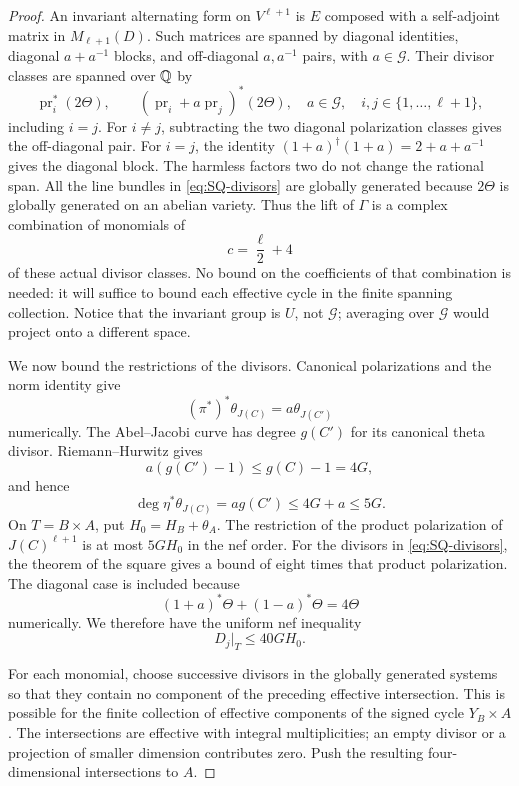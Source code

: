 \begin{proof}
An invariant alternating form on $V^{\ell+1}$ is $E$ composed with a self-adjoint matrix in $M_{\ell+1}(D)$. Such matrices are spanned by diagonal identities, diagonal $a+a^{-1}$ blocks, and off-diagonal $a,a^{-1}$ pairs, with $a\in\mathcal G$. Their divisor classes are spanned over $\mathbb Q$ by
\begin{equation}\label{eq:SQ-divisors}
 \operatorname{pr}_i^*(2\Theta),\qquad
 (\operatorname{pr}_i+a\operatorname{pr}_j)^*(2\Theta),
 \quad a\in\mathcal G,\quad i,j\in\{1,\ldots,\ell+1\},
\end{equation}
including $i=j$. For $i\ne j$, subtracting the two diagonal polarization classes gives the off-diagonal pair. For $i=j$, the identity
$(1+a)^\dagger(1+a)=2+a+a^{-1}$ gives the diagonal block. The harmless factors two do not change the rational span. All the line bundles in \eqref{eq:SQ-divisors} are globally generated because $2\Theta$ is globally generated on an abelian variety. Thus the lift of $\Gamma$ is a complex combination of monomials of
\[
 c=\frac\ell2+4
\]
of these actual divisor classes. No bound on the coefficients of that combination is needed: it will suffice to bound each effective cycle in the finite spanning collection. Notice that the invariant group is $U$, not $\mathcal G$; averaging over $\mathcal G$ would project onto a different space.

We now bound the restrictions of the divisors. Canonical polarizations and the norm identity give
\[
 (\pi^*)^*\theta_{J(C)}=a\theta_{J(C')}
\]
numerically. The Abel--Jacobi curve has degree $g(C')$ for its canonical theta divisor. Riemann--Hurwitz gives
\[
 a(g(C')-1)\le g(C)-1=4G,
\]
and hence
\begin{equation}\label{eq:SQ-curvedegree}
 \deg\eta^*\theta_{J(C)}=a g(C')\le4G+a\le5G.
\end{equation}
On $T=B\times A$, put $H_0=H_B+\theta_A$. The restriction of the product polarization of $J(C)^{\ell+1}$ is at most $5GH_0$ in the nef order. For the divisors in \eqref{eq:SQ-divisors}, the theorem of the square gives a bound of eight times that product polarization. The diagonal case is included because
\[
 (1+a)^*\Theta+(1-a)^*\Theta=4\Theta
\]
numerically. We therefore have the uniform nef inequality
\begin{equation}\label{eq:SQ-nef}
 D_j|_T\le40G H_0.
\end{equation}

For each monomial, choose successive divisors in the globally generated systems so that they contain no component of the preceding effective intersection. This is possible for the finite collection of effective components of the signed cycle $Y_B\times A$. The intersections are effective with integral multiplicities; an empty divisor or a projection of smaller dimension contributes zero. Push the resulting four-dimensional intersections to $A$.


\end{proof}
